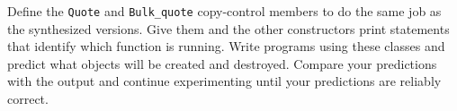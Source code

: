 %
%
\begin{question}
Define the \verb|Quote| and \verb|Bulk_quote| copy-control members
to do the same job as the synthesized versions. Give them and the other
constructors print statements that identify which function is running. Write
programs using these classes and predict what objects will be created and
destroyed. Compare your predictions with the output and continue
experimenting until your predictions are reliably correct.
\end{question}
